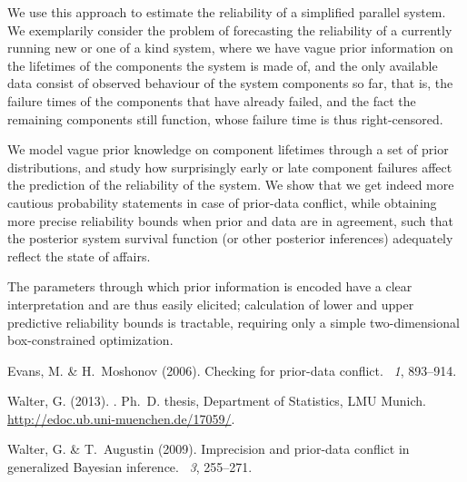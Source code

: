 \documentclass[12pt,a4paper,twocolumn,fleqn]{narmsabs}
\begin{document}
We use this approach to estimate the reliability of a simplified parallel system.
We exemplarily consider the problem of forecasting the reliability of a currently running new or one of a kind system,
where we have vague prior information on the lifetimes of the components the system is made of,
and the only available data consist of observed behaviour of the system components so far,
that is, the failure times of the components that have already failed,
and the fact the remaining components still function,
whose failure time is thus right-censored.

We model vague prior knowledge on component lifetimes through a set of prior distributions,
and study how surprisingly early or late component failures
affect the prediction of the reliability of the system.
We show that we get indeed more cautious probability statements in case of prior-data conflict,
while obtaining more precise reliability bounds when prior and data are in agreement,
such that the posterior system survival function (or other posterior inferences)
adequately reflect the state of affairs.

The parameters through which prior information is encoded have a clear interpretation
and are thus easily elicited;
calculation of lower and upper predictive reliability bounds is tractable,
requiring only a simple two-dimensional box-constrained optimization.


%
%

\begin{thebibliography}{9}
Evans, M. \& H.~Moshonov (2006).
\newblock Checking for prior-data conflict.
~{\em 1}, 893--914.

Walter, G. (2013).
.
\newblock Ph.\ D. thesis, Department of Statistics, LMU Munich.
\newblock \url{http://edoc.ub.uni-muenchen.de/17059/}.

Walter, G. \& T.~Augustin (2009).
\newblock Imprecision and prior-data conflict in generalized {B}ayesian
  inference.
~{\em 3}, 255--271.
\end{thebibliography}
\end{document}
